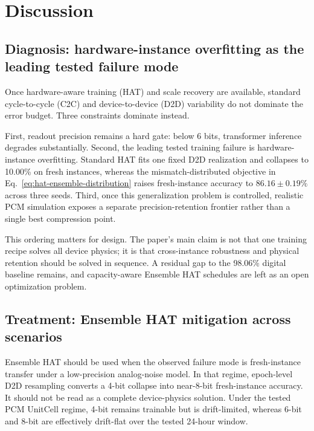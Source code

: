 \section{Discussion}
\label{sec:discussion}

\subsection{Diagnosis: hardware-instance overfitting as the leading tested failure mode}
\label{subsec:diagnosis}

Once hardware-aware training (HAT) and scale recovery are available, standard cycle-to-cycle (C2C) and device-to-device (D2D) variability do not dominate the error budget. Three constraints dominate instead.

First, readout precision remains a hard gate: below 6 bits, transformer inference degrades substantially. Second, the leading tested training failure is hardware-instance overfitting. Standard HAT fits one fixed D2D realization and collapses to 10.00\% on fresh instances, whereas the mismatch-distributed objective in Eq.~\ref{eq:hat-ensemble-distribution} raises fresh-instance accuracy to $86.16\pm0.19\%$ across three seeds. Third, once this generalization problem is controlled, realistic PCM simulation exposes a separate precision-retention frontier rather than a single best compression point.

This ordering matters for design. The paper's main claim is not that one training recipe solves all device physics; it is that cross-instance robustness and physical retention should be solved in sequence. A residual gap to the 98.06\% digital baseline remains, and capacity-aware Ensemble HAT schedules are left as an open optimization problem.

\subsection{Treatment: Ensemble HAT mitigation across scenarios}
\label{subsec:treatment}

Ensemble HAT should be used when the observed failure mode is fresh-instance transfer under a low-precision analog-noise model. In that regime, epoch-level D2D resampling converts a 4-bit collapse into near-8-bit fresh-instance accuracy. It should not be read as a complete device-physics solution. Under the tested PCM UnitCell regime, 4-bit remains trainable but is drift-limited, whereas 6-bit and 8-bit are effectively drift-flat over the tested 24-hour window.

